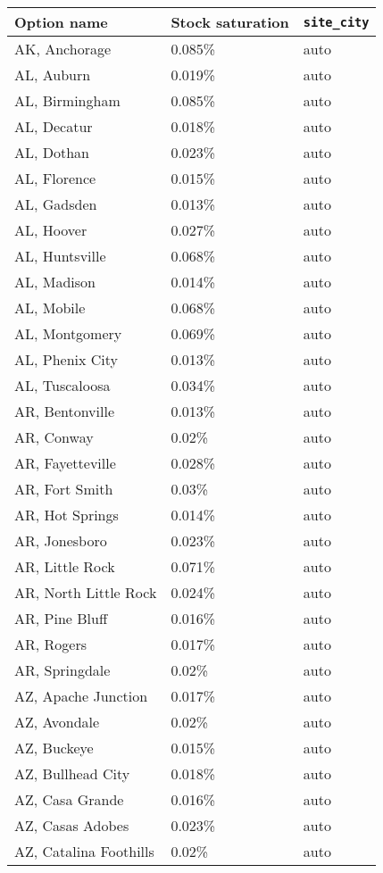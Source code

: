 \begin{longtable}[]{@{}lll@{}}
\toprule\noalign{}
Option name & Stock saturation & \texttt{site\_city} \\
\midrule\noalign{}
\endhead
\bottomrule\noalign{}
\endlastfoot
AK, Anchorage & 0.085\% & auto \\
AL, Auburn & 0.019\% & auto \\
AL, Birmingham & 0.085\% & auto \\
AL, Decatur & 0.018\% & auto \\
AL, Dothan & 0.023\% & auto \\
AL, Florence & 0.015\% & auto \\
AL, Gadsden & 0.013\% & auto \\
AL, Hoover & 0.027\% & auto \\
AL, Huntsville & 0.068\% & auto \\
AL, Madison & 0.014\% & auto \\
AL, Mobile & 0.068\% & auto \\
AL, Montgomery & 0.069\% & auto \\
AL, Phenix City & 0.013\% & auto \\
AL, Tuscaloosa & 0.034\% & auto \\
AR, Bentonville & 0.013\% & auto \\
AR, Conway & 0.02\% & auto \\
AR, Fayetteville & 0.028\% & auto \\
AR, Fort Smith & 0.03\% & auto \\
AR, Hot Springs & 0.014\% & auto \\
AR, Jonesboro & 0.023\% & auto \\
AR, Little Rock & 0.071\% & auto \\
AR, North Little Rock & 0.024\% & auto \\
AR, Pine Bluff & 0.016\% & auto \\
AR, Rogers & 0.017\% & auto \\
AR, Springdale & 0.02\% & auto \\
AZ, Apache Junction & 0.017\% & auto \\
AZ, Avondale & 0.02\% & auto \\
AZ, Buckeye & 0.015\% & auto \\
AZ, Bullhead City & 0.018\% & auto \\
AZ, Casa Grande & 0.016\% & auto \\
AZ, Casas Adobes & 0.023\% & auto \\
AZ, Catalina Foothills & 0.02\% & auto \\

\end{longtable}
